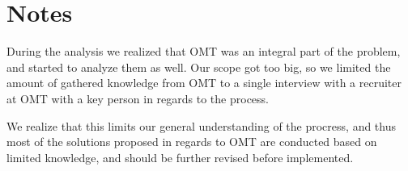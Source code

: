 \section{Notes}
During the analysis we realized that OMT was an integral part of the problem, and started to analyze them as well.
Our scope got too big, so we limited the amount of gathered knowledge from OMT to a single interview with a recruiter at OMT with a key person in regards to the process. 

We realize that this limits our general understanding of the procress, and thus most of the solutions proposed in regards to OMT are conducted based on limited knowledge, and should be further revised before implemented. 
